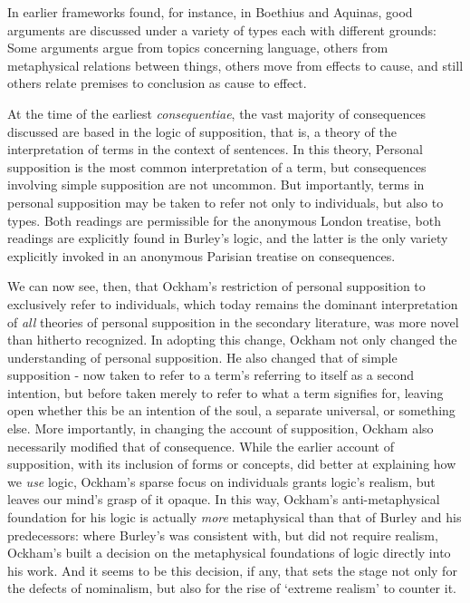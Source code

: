 \documentclass[a4paper,11pt]{article}
\begin{document}
In earlier frameworks found, for instance, in Boethius and Aquinas, good arguments are discussed under a variety of types each with different grounds: Some arguments argue from topics concerning language, others from metaphysical relations between things, others move from effects to cause, and still others relate premises to conclusion as cause to effect.

At the time of the earliest \textit{consequentiae}, the vast majority of consequences discussed are based in the logic of supposition, that is, a theory of the interpretation of terms in the context of sentences. In this theory, Personal supposition is the most common interpretation of a term, but consequences involving simple supposition are not uncommon. But importantly, terms in personal supposition may be taken to refer not only to individuals, but also to types. Both readings are permissible for the anonymous London treatise, both readings are explicitly found in Burley's logic, and the latter is the only variety explicitly invoked in an anonymous Parisian treatise on consequences. 

We can now see, then, that Ockham's restriction of personal supposition to exclusively refer to individuals, which today remains the dominant interpretation of \textit{all} theories of personal supposition in the secondary literature, was more novel than hitherto recognized. In adopting this change, Ockham not only changed the understanding of personal supposition. He also changed that of simple supposition - now taken to refer to a term's referring to itself as a second intention, but before taken merely to refer to what a term signifies for, leaving open whether this be an intention of the soul, a separate universal, or something else. More importantly, in changing the account of supposition, Ockham also necessarily modified that of consequence. While the earlier account of supposition, with its inclusion of forms or concepts, did better at explaining how we \textit{use} logic, Ockham's sparse focus on individuals grants logic's realism, but leaves our mind's grasp of it opaque. In this way, Ockham's anti-metaphysical foundation for his logic is actually \textit{more} metaphysical than that of Burley and his predecessors: where Burley's was consistent with, but did not require realism, Ockham's built a decision on the metaphysical foundations of logic directly into his work. And it seems to be this decision, if any, that sets the stage not only for the defects of nominalism, but also for the rise of `extreme realism' to counter it.

\end{document}
